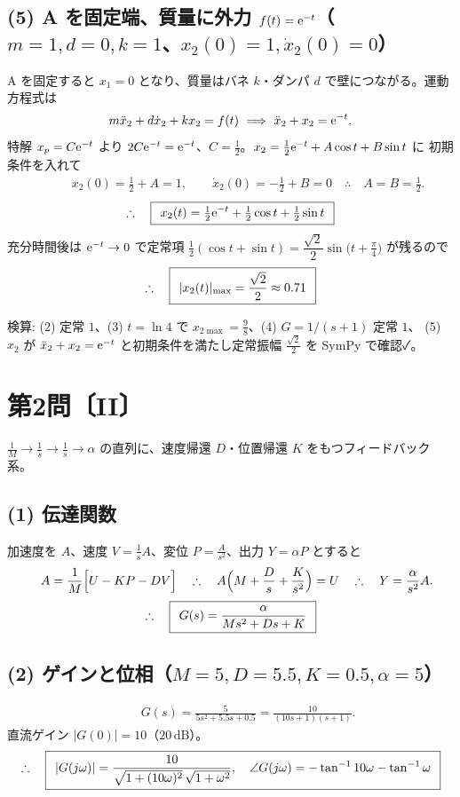 \documentclass[11pt,a4paper]{article}
\begin{document}
\subsection*{(5) A を固定端、質量に外力 $f(t)=\mathrm{e}^{-t}$（$m=1,d=0,k=1$、$x_2(0)=1,\dot x_2(0)=0$）}
A を固定すると $x_1=0$ となり、質量はバネ $k$・ダンパ $d$ で壁につながる。運動方程式は
\[
  m\ddot{x}_2+d\dot{x}_2+kx_2=f(t)\ \Longrightarrow\ \ddot{x}_2+x_2=\e^{-t}.
\]
特解 $x_p=C\mathrm{e}^{-t}$ より $2C\mathrm{e}^{-t}=\mathrm{e}^{-t}$、$C=\tfrac12$。$x_2=\tfrac12\mathrm{e}^{-t}+A\cos t+B\sin t$ に
初期条件を入れて
\begin{align*}
  &\qquad x_2(0)=\tfrac12+A=1,\qquad \dot{x}_2(0)=-\tfrac12+B=0
   \quad\therefore\quad A=B=\tfrac12.
\end{align*}
\[
  \therefore\quad \boxed{\,\;x_2(t)=\tfrac12\mathrm{e}^{-t}+\tfrac12\cos t+\tfrac12\sin t\;\,}
\]
充分時間後は $\mathrm{e}^{-t}\to0$ で定常項 $\tfrac12(\cos t+\sin t)=\dfrac{\sqrt2}{2}\sin\!\bigl(t+\tfrac{\pi}{4}\bigr)$ が残るので
\[
  \therefore\quad \boxed{\,\;|x_2(t)|_{\max}=\dfrac{\sqrt2}{2}\approx0.71\;\,}
\]

\bigskip
\noindent 検算: (2) 定常 $1$、(3) $t=\ln4$ で $x_{2\max}=\tfrac98$、(4) $G=1/(s+1)$ 定常 $1$、
(5) $x_2$ が $\ddot x_2+x_2=\mathrm{e}^{-t}$ と初期条件を満たし定常振幅 $\tfrac{\sqrt2}{2}$ を SymPy で確認✓。

\newpage
\section*{第2問〔II〕}

$\frac1M\to\frac1s\to\frac1s\to\alpha$ の直列に、速度帰還 $D$・位置帰還 $K$ をもつフィードバック系。

\subsection*{(1) 伝達関数}
加速度を $A$、速度 $V=\frac1s A$、変位 $P=\frac{A}{s^2}$、出力 $Y=\alpha P$ とすると
\begin{align*}
  &\qquad A=\frac1M\Bigl[U-KP-DV\Bigr]
   \quad\therefore\quad A\Bigl(M+\frac{D}{s}+\frac{K}{s^2}\Bigr)=U
   \quad\therefore\quad Y=\frac{\alpha}{s^2}A.
\end{align*}
\[
  \therefore\quad \boxed{\,\;G(s)=\dfrac{\alpha}{Ms^2+Ds+K}\;\,}
\]

\subsection*{(2) ゲインと位相（$M=5,D=5.5,K=0.5,\alpha=5$）}
\begin{align*}
  &\qquad G(s)=\frac{5}{5s^2+5.5s+0.5}=\frac{10}{(10s+1)(s+1)}.
\end{align*}
直流ゲイン $|G(0)|=10$（$20\,\mathrm{dB}$）。
\[
  \therefore\quad \boxed{\,\;|G(j\omega)|=\dfrac{10}{\sqrt{1+(10\omega)^2}\,\sqrt{1+\omega^2}},\quad
  \angle G(j\omega)=-\tan^{-1}10\omega-\tan^{-1}\omega\;\,}
\]
\end{document}
